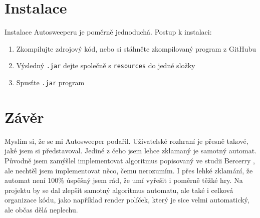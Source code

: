 
\section{Instalace}
Instalace Autosweeperu je poměrně jednoduchá. Postup k instalaci:
\begin{enumerate}
    \item Zkompilujte zdrojový kód, nebo si stáhněte zkompilovaný program z GitHubu
    \item Výsledný {\tt .jar} dejte společně s {\tt resources} do jedné složky
    \item Spusťte {\tt .jar} program
\end{enumerate}

\section{Závěr}
Myslím si, že se mi Autosweeper podařil. Uživatelské rozhraní je přesně takové, jaké jsem si představoval. Jediné z čeho jsem lehce
zklamaný je samotný automat. Původně jsem zamýšlel implementovat algoritmus popisovaný ve studii Bercerry \autocite{bercerra2015}, ale
nechtěl jsem implementovat něco, čemu nerozumím. I přes lehké zklamání, že automat není 100\% úspěšný jsem rád, že umí vyřešit i
poměrně těžké hry. Na projektu by se dal zlepšit samotný algoritmus automatu, ale také i celková organizace kódu, jako například render políček,
který je sice velmi automatický, ale občas dělá neplechu.